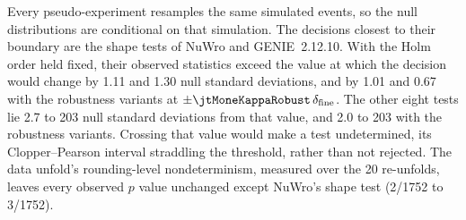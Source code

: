 Every pseudo-experiment resamples the same simulated events, so the null distributions are conditional on that simulation. The decisions closest to their boundary are the shape tests of NuWro and GENIE~2.12.10. With the Holm order held fixed, their observed statistics exceed the value at which the decision would change by 1.11 and 1.30 null standard deviations, and by 1.01 and 0.67 with the robustness variants at $\pm\jtMoneKappaRobust\,\delta_{\mathrm{fine}}$. The other eight tests lie 2.7 to 203 null standard deviations from that value, and 2.0 to 203 with the robustness variants. Crossing that value would make a test undetermined, its Clopper--Pearson interval straddling the threshold, rather than not rejected. The data unfold's rounding-level nondeterminism, measured over the 20 re-unfolds, leaves every observed $p$ value unchanged except NuWro's shape test (2/1752 to 3/1752).

